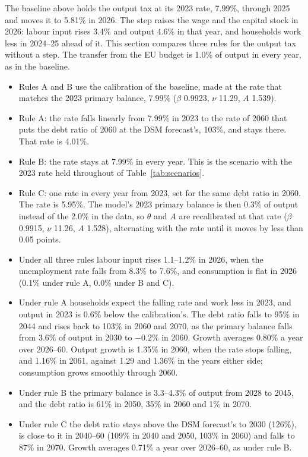 \documentclass[11pt,a4paper]{article}
\begin{document}
\noindent\footnotesize
The baseline above holds the output tax at its 2023 rate, 7.99\%, through
2025 and moves it to 5.81\% in 2026. The step raises the wage and the
capital stock in 2026: labour input rises 3.4\% and output 4.6\% in that
year, and households work less in 2024--25 ahead of it. This section
compares three rules for the output tax without a step. The transfer from
the EU budget is 1.0\% of output in every year, as in the baseline.
\begin{itemize}
\item Rules A and B use the calibration of the baseline, made at the rate
  that matches the 2023 primary balance, 7.99\% ($\beta$ 0.9923, $\nu$
  11.29, $A$ 1.539).
\item Rule A: the rate falls linearly from 7.99\% in 2023 to the rate of 2060
  that puts the debt ratio of 2060 at the DSM forecast's, 103\%, and stays
  there. That rate is 4.01\%.
\item Rule B: the rate stays at 7.99\% in every year. This is the scenario
  with the 2023 rate held throughout of Table~\ref{tab:scenarios}.
\item Rule C: one rate in every year from 2023, set for the same debt ratio
  in 2060. The rate is 5.95\%. The model's 2023 primary balance is then
  0.3\% of output instead of the 2.0\% in the data, so $\theta$ and $A$ are
  recalibrated at that rate ($\beta$ 0.9915, $\nu$ 11.26, $A$ 1.528),
  alternating with the rate until it moves by less than 0.05 points.
\item Under all three rules labour input rises 1.1--1.2\% in 2026, when the
  unemployment rate falls from 8.3\% to 7.6\%, and consumption is flat in
  2026 (0.1\% under rule A, 0.0\% under B and C).
\item Under rule A households expect the falling rate and work less in
  2023, and output in 2023 is 0.6\% below the calibration's. The debt ratio
  falls to 95\% in 2044 and rises back to 103\% in 2060 and 2070, as the
  primary balance falls from 3.6\% of output in 2030 to $-0.2$\% in 2060.
  Growth averages 0.80\% a year over 2026--60. Output growth is 1.35\% in
  2060, when the rate stops falling, and 1.16\% in 2061, against 1.29 and
  1.36\% in the years either side; consumption grows smoothly through 2060.
\item Under rule B the primary balance is 3.3--4.3\% of output from 2028 to
  2045, and the debt ratio is 61\% in 2050, 35\% in 2060 and 1\% in 2070.
\item Under rule C the debt ratio stays above the DSM forecast's to 2030
  (126\%), is close to it in 2040--60 (109\% in 2040 and 2050, 103\% in
  2060) and falls to 87\% in 2070. Growth averages 0.71\% a year over
  2026--60, as under rule B.
\end{itemize}
\end{document}
